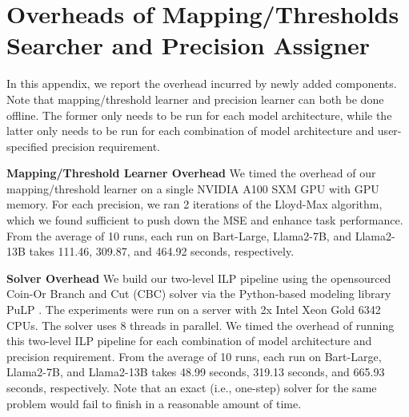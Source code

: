 \section{Overheads of Mapping/Thresholds Searcher and Precision Assigner}\label{app:overhead}

In this appendix, we report the overhead incurred by  newly added components. Note that  mapping/threshold learner and precision learner can both be done offline. The former only needs to be run for each model architecture, while the latter only needs to be run for each combination of model architecture and user-specified precision requirement.

\textbf{Mapping/Threshold Learner Overhead} We timed the overhead of our mapping/threshold learner on a single NVIDIA A100 SXM GPU with GPU memory. For each precision, we ran 2 iterations of the Lloyd-Max algorithm, which we found sufficient to push down the MSE and enhance task performance.  From the average of 10 runs, each run on Bart-Large, Llama2-7B, and Llama2-13B takes 111.46, 309.87, and 464.92 seconds, respectively. 



\textbf{Solver Overhead} We build our two-level ILP pipeline using the opensourced Coin-Or Branch and Cut (CBC) \cite{saltzman2002coin} solver via the Python-based modeling library PuLP \cite{mitchell2011pulp}. The experiments were run on a server with 2x Intel Xeon Gold 6342 CPUs. The solver uses 8 threads in parallel. We timed the overhead of running this two-level ILP pipeline for each combination of model architecture and precision requirement. From the average of 10 runs, each run on Bart-Large, Llama2-7B, and Llama2-13B takes 48.99 seconds, 319.13 seconds, and 665.93 seconds, respectively. Note that an exact (i.e., one-step) solver for the same problem would fail to finish in a reasonable amount of time. 

